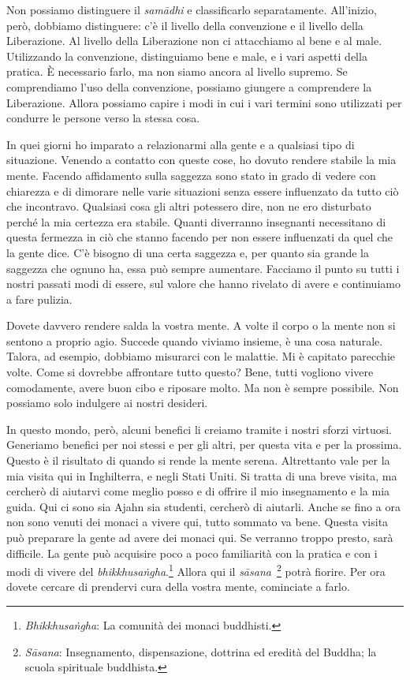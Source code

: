 Non possiamo distinguere il \emph{samādhi} e classificarlo
separatamente. All'inizio, però, dobbiamo distinguere: c'è il livello
della convenzione e il livello della Liberazione. Al livello della
Liberazione non ci attacchiamo al bene e al male. Utilizzando la
convenzione, distinguiamo bene e male, e i vari aspetti della pratica. È
necessario farlo, ma non siamo ancora al livello supremo. Se
comprendiamo l'uso della convenzione, possiamo giungere a comprendere la
Liberazione. Allora possiamo capire i modi in cui i vari termini sono
utilizzati per condurre le persone verso la stessa cosa.

In quei giorni ho imparato a relazionarmi alla gente e a qualsiasi tipo
di situazione. Venendo a contatto con queste cose, ho dovuto rendere
stabile la mia mente. Facendo affidamento sulla saggezza sono stato in
grado di vedere con chiarezza e di dimorare nelle varie situazioni senza
essere influenzato da tutto ciò che incontravo. Qualsiasi cosa gli altri
potessero dire, non ne ero disturbato perché la mia certezza era
stabile. Quanti diverranno insegnanti necessitano di questa fermezza in
ciò che stanno facendo per non essere influenzati da quel che la gente
dice. C'è bisogno di una certa saggezza e, per quanto sia grande la
saggezza che ognuno ha, essa può sempre aumentare. Facciamo il punto su
tutti i nostri passati modi di essere, sul valore che hanno rivelato di
avere e continuiamo a fare pulizia.

Dovete davvero rendere salda la vostra mente. A volte il corpo o la
mente non si sentono a proprio agio. Succede quando viviamo insieme, è
una cosa naturale. Talora, ad esempio, dobbiamo misurarci con le
malattie. Mi è capitato parecchie volte. Come si dovrebbe affrontare
tutto questo? Bene, tutti vogliono vivere comodamente, avere buon cibo e
riposare molto. Ma non è sempre possibile. Non possiamo solo indulgere
ai nostri desideri.

In questo mondo, però, alcuni benefici li creiamo tramite i nostri
sforzi virtuosi. Generiamo benefici per noi stessi e per gli altri, per
questa vita e per la prossima. Questo è il risultato di quando si rende
la mente serena. Altrettanto vale per la mia visita qui in Inghilterra,
e negli Stati Uniti. Si tratta di una breve visita, ma cercherò di
aiutarvi come meglio posso e di offrire il mio insegnamento e la mia
guida. Qui ci sono sia Ajahn sia studenti, cercherò di aiutarli. Anche
se fino a ora non sono venuti dei monaci a vivere qui, tutto sommato va
bene. Questa visita può preparare la gente ad avere dei monaci qui. Se
verranno troppo presto, sarà difficile. La gente può acquisire poco a
poco familiarità con la pratica e con i modi di vivere del
\emph{bhikkhusaṅgha}.\footnote{\emph{Bhikkhusaṅgha}: La comunità dei
  monaci buddhisti.} Allora qui il \emph{sāsana~}\footnote{\emph{Sāsana}:
  Insegnamento, dispensazione, dottrina ed eredità del Buddha; la scuola
  spirituale buddhista.} potrà fiorire. Per ora dovete cercare di
prendervi cura della vostra mente, cominciate a farlo.

